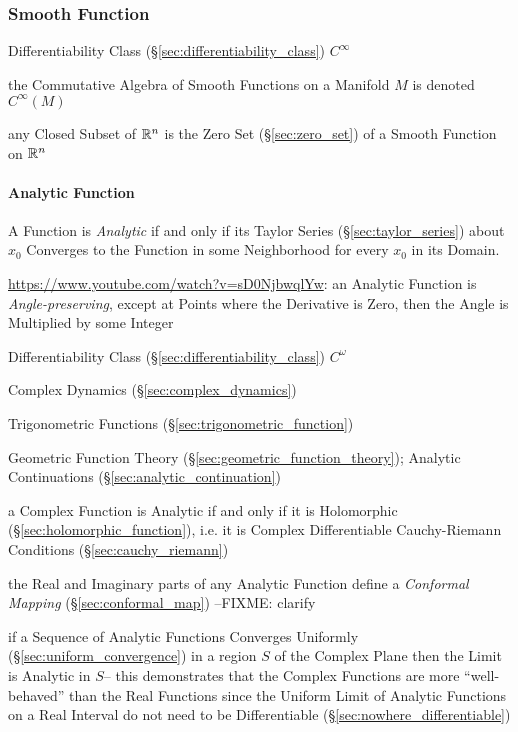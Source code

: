 \subsubsection{Smooth Function}\label{sec:smooth_function}

Differentiability Class (\S\ref{sec:differentiability_class}) $C^{\infty}$

the Commutative Algebra of Smooth Functions on a Manifold $M$ is denoted
$C^\infty(M)$ %

any Closed Subset of $\mathbb{R}^n$ is the Zero Set (\S\ref{sec:zero_set}) of a
Smooth Function on $\mathbb{R}^n$



\paragraph{Analytic Function}\label{sec:analytic_function}\hfill

A Function is \emph{Analytic} if and only if its Taylor Series
(\S\ref{sec:taylor_series}) about $x_0$ Converges to the Function in some
Neighborhood for every $x_0$ in its Domain.

\url{https://www.youtube.com/watch?v=sD0NjbwqlYw}: an Analytic Function is
\emph{Angle-preserving}, except at Points where the Derivative is Zero, then the
Angle is Multiplied by some Integer

Differentiability Class (\S\ref{sec:differentiability_class}) $C^{\omega}$

Complex Dynamics (\S\ref{sec:complex_dynamics})

Trigonometric Functions (\S\ref{sec:trigonometric_function})

\fist Geometric Function Theory (\S\ref{sec:geometric_function_theory});
Analytic Continuations (\S\ref{sec:analytic_continuation})

a Complex Function is Analytic if and only if it is Holomorphic
(\S\ref{sec:holomorphic_function}), i.e. it is Complex Differentiable \fist
Cauchy-Riemann Conditions (\S\ref{sec:cauchy_riemann})

the Real and Imaginary parts of any Analytic Function define a \emph{Conformal
  Mapping} (\S\ref{sec:conformal_map}) --FIXME: clarify

if a Sequence of Analytic Functions Converges Uniformly
(\S\ref{sec:uniform_convergence}) in a region $S$ of the Complex Plane then the
Limit is Analytic in $S$-- this demonstrates that the Complex Functions are
more ``well-behaved'' than the Real Functions since the Uniform Limit of
Analytic Functions on a Real Interval do not need to be Differentiable
(\S\ref{sec:nowhere_differentiable})

